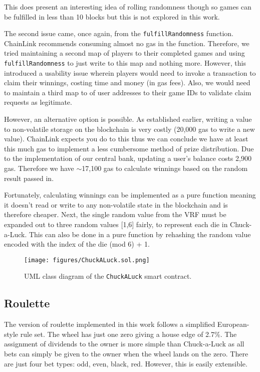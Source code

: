\documentclass[10pt,journal,compsoc]{IEEEtran}
\begin{document}
This does present an interesting idea of rolling randomness though so games can be fulfilled in less than 10 blocks but this is not explored in this work.

The second issue came, once again, from the \texttt{fulfillRandomness} function. ChainLink recommends consuming almost no gas in the function. Therefore, we tried maintaining a second map of players to their completed games and using \texttt{fulfillRandomness} to just write to this map and nothing more. However, this introduced a usability issue wherein players would need to invoke a transaction to claim their winnings, costing time and money (in gas fees). Also, we would need to maintain a third map to of user addresses to their game IDs to validate claim requests as legitimate.

However, an alternative option is possible. As established earlier, writing a value to non-volatile storage on the blockchain is very costly (20,000 gas to write a new value). ChainLink expects you do to this thus we can conclude we have at least this much gas to implement a less cumbersome method of prize distribution. Due to the implementation of our central bank, updating a user's balance costs 2,900 gas. Therefore we have $\sim$17,100 gas to calculate winnings based on the random result passed in.

Fortunately, calculating winnings can be implemented as a pure function meaning it doesn't read or write to any non-volatile state in the blockchain and is therefore cheaper. Next, the single random value from the VRF must be expanded out to three random values [1,6] fairly, to represent each die in Chuck-a-Luck. This can also be done in a pure function by rehashing the random value encoded with the index of the die (mod 6) + 1.

\begin{figure}[!h]
    \centering
    \texttt{[image: figures/ChuckALuck.sol.png]}
    \caption{UML class diagram of the \texttt{ChuckALuck} smart contract.}
    \label{fig:chuckuml}
\end{figure}
\subsection{Roulette}
The version of roulette implemented in this work follows a simplified European-style rule set. The wheel has just one zero giving a house edge of 2.7\%. The assignment of dividends to the owner is more simple than Chuck-a-Luck as all bets can simply be given to the owner when the wheel lands on the zero. There are just four bet types: odd, even, black, red. However, this is easily extensible.
\end{document}
